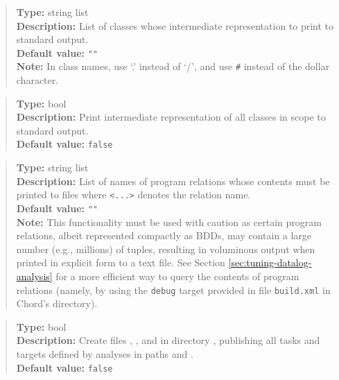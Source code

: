 \begin{quote}
{\bf Type:} string list  \\
{\bf Description:} List of classes whose intermediate representation to print to standard output. \\
{\bf Default value:} {\tt ""} \\
{\bf Note:} In class names, use `.' instead of `/', and use {\tt \#} instead of the dollar character. 
\end{quote}

\begin{quote}
{\bf Type:} bool \\
{\bf Description:} Print intermediate representation of all classes in scope to standard output. \\
{\bf Default value:} {\tt false}
\end{quote}

\begin{quote}
{\bf Type:} string list  \\
{\bf Description:} List of names of program relations whose contents must be printed to files  where {\tt <...>} denotes the relation name. \\
{\bf Default value:} {\tt ""} \\
{\bf Note:} This functionality must be used with caution as certain program relations, albeit represented compactly as BDDs, may contain a large number (e.g., millions) of tuples, resulting in voluminous output when printed in explicit form to a text file.  See Section \ref{sec:tuning-datalog-analysis} for a more efficient way to query the contents of program relations (namely, by using the {\tt debug} target provided in file {\tt build.xml} in Chord's  directory).
\end{quote}

\begin{quote}
{\bf Type:} bool \\
{\bf Description:} Create files , , and  in directory , publishing all tasks and targets defined by analyses in paths  and .  \\
{\bf Default value:} {\tt false}
\end{quote}

